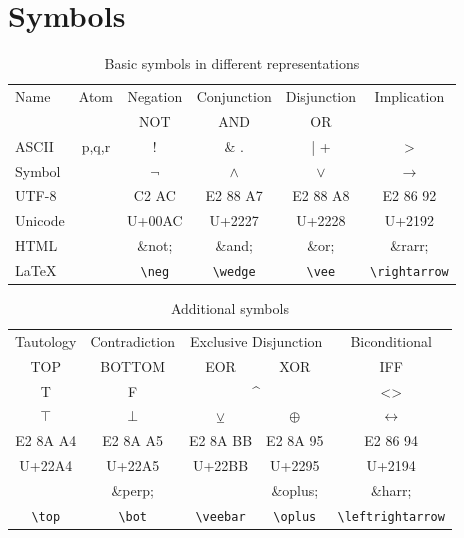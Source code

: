 




\chapter{Symbols}
\label{app:SYMBOLS}

\begin{table}[htdp]
\begin{center}
\begin{tabular}{lccccc}
Name	& Atom 	& Negation		& Conjunction		& Disjunction		&  Implication \\
		&  		& NOT		& AND		& OR		&   \\
ASCII 	& p,q,r 	& ! 			& \& \quad .	& |  \quad +			&> 	\\
Symbol  	&		& $\neg$		& $\wedge$	& {$\vee$}		&$\rightarrow$ \\ 
UTF-8	&		& C2 AC		& E2 88 A7	& {E2 88 A8}	&E2 86 92\\
Unicode	&		& U+00AC 	& U+2227		& {U+2228}	&U+2192\\
HTML	&		& \&not;		& \&and;		& \&or;		& \&rarr;  \\
LaTeX	&		& \verb+\neg+	& \verb+\wedge+ & \verb+\vee+ & \verb+\rightarrow+ \\

\end{tabular}
\caption{Basic symbols in different representations}
\label{tab:BASICSYMBOLS}
\end{center}
\end{table}%

\begin{table}[htdp]
\begin{center}
\begin{tabular}{ccccc}
Tautology		& Contradiction		& \multicolumn{2}{c}{Exclusive Disjunction}	& Biconditional \\	
TOP			& BOTTOM		& EOR & XOR							& IFF \\
T \quad 1		& F  \quad 0		& \multicolumn{2}{c}{\textasciicircum} 		& <> \\
$\top$		& $\bot$			& $\veebar$ 							&$\oplus$   			&$ \leftrightarrow$\\
E2 8A A4		& E2 8A A5		& E2 8A BB							& E2 8A 95			&E2 86 94\\
U+22A4		& U+22A5			& U+22BB							& U+2295				&U+2194\\
			& \&perp;			&									& \&oplus;				& \&harr;\\
\verb+\top+	& \verb+\bot+	& \verb+\veebar+ & \verb+\oplus+	& \verb+\leftrightarrow+
\end{tabular}
\caption{Additional symbols}
\label{tab:ADDITIONALSYMBOLS}
\end{center}
\end{table}%



